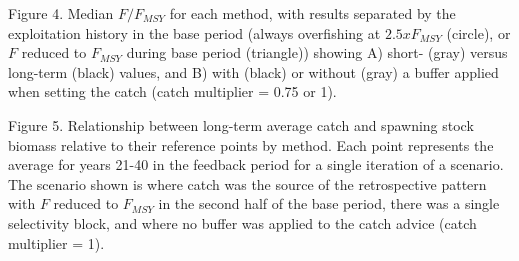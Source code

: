 \documentclass[
  12pt,
]{article}
\begin{document}
Figure 4. Median \(F / F_{MSY}\) for each method, with results separated by the exploitation history in the base period (always overfishing at \(2.5 x F_{MSY}\) (circle), or \(F\) reduced to \(F_{MSY}\) during base period (triangle)) showing A) short- (gray) versus long-term (black) values, and B) with (black) or without (gray) a buffer applied when setting the catch (catch multiplier = 0.75 or 1).

Figure 5. Relationship between long-term average catch and spawning stock biomass relative to their reference points by method. Each point represents the average for years 21-40 in the feedback period for a single iteration of a scenario. The scenario shown is where catch was the source of the retrospective pattern with \(F\) reduced to \(F_{MSY}\) in the second half of the base period, there was a single selectivity block, and where no buffer was applied to the catch advice (catch multiplier = 1).
\end{document}
